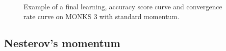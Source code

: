 \begin{appendices}
\begin{figure}[H]
\begin{subfigure}{0.40\textwidth}
                    \label{fig:monks_3_ACC_SGD}
                \end{subfigure}
                \begin{subfigure}{0.40\textwidth}
                    \caption{}
                    \label{fig:monks_3_NORM_SGD}
                \end{subfigure}
                \caption{Example of a final learning, accuracy score curve and
                convergence rate curve on MONKS 3 with standard momentum.}
                \label{fig:monks_3_SGD}
            \end{figure}


            \subsection{Nesterov's momentum} %
            \label{sub:nesterov_s_momentum}


\end{appendices}
